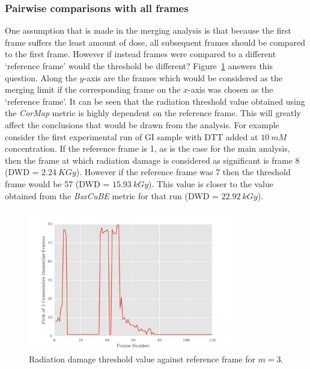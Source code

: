 \subsubsection{Pairwise comparisons with all frames}
\label{subs:Pairwise comparisons with all frames}
One assumption that is made in the merging analysis is that because the first frame suffers the least amount of dose, all subsequent frames should be compared to the first frame.
However if instead frames were compared to a different `reference frame' would the threshold be different?
Figure~\ref{fig:First n diff frames - DTT} answers this question.
Along the $y$-axis are the frames which would be considered as the merging limit if the corresponding frame on the $x$-axis was chosen as the `reference frame'.
It can be seen that the radiation threshold value obtained using the \textit{CorMap} metric is highly dependent on the reference frame.
This will greatly affect the conclusions that would be drawn from the analysis.
For example consider the first experimental run of GI sample with DTT added at $10\ mM$ concentration.
If the reference frame is 1, as is the case for the main analysis, then the frame at which radiation damage is considered as significant is frame 8 (DWD = $2.24\ KGy$).
However if the reference frame was 7 then the threshold frame would be 57 (DWD = $15.93\ kGy$).
This value is closer to the value obtained from the \textit{BsxCuBE} metric for that run (DWD = $22.92\ kGy$).
\begin{figure}
    \centering
    \includegraphics[width=0.8\textwidth]{figures/saxs/dtt_first_n_plot.pdf}
    \caption{Radiation damage threshold value against reference frame for $m = 3$.}
    \label{fig:First n diff frames - DTT}
\end{figure}

